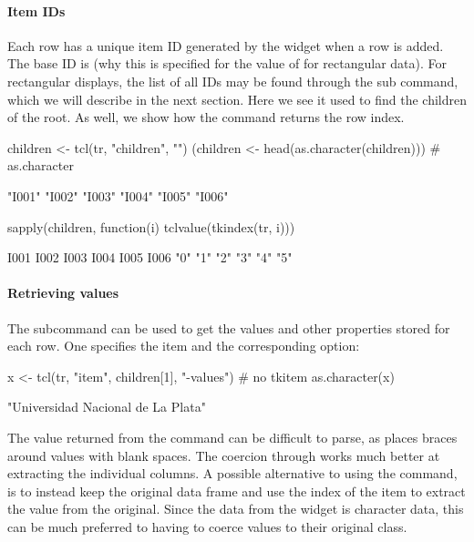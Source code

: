 \paragraph{Item IDs}
Each row has a unique item ID generated by the widget when a row is
added. The base ID is \qcode{} (why this is specified for the value of
 for rectangular data). For rectangular displays, the
list of all IDs may be found through the 
sub command, which we will describe in the next section.  Here we see
it used to find the children of the root. As well, we show how the
 command returns the row index.
\begin{Schunk}
\begin{Sinput}
 children <- tcl(tr, "children", "")
 (children <- head(as.character(children)))     # as.character
\end{Sinput}
\begin{Soutput}
[1] "I001" "I002" "I003" "I004" "I005" "I006"
\end{Soutput}
\begin{Sinput}
 sapply(children, function(i) tclvalue(tkindex(tr, i)))
\end{Sinput}
\begin{Soutput}
I001 I002 I003 I004 I005 I006 
 "0"  "1"  "2"  "3"  "4"  "5" 
\end{Soutput}
\end{Schunk}

\paragraph{Retrieving values}
The  subcommand can be used to get the
values and other properties stored for each row. One specifies the item and the
corresponding option:
\begin{Schunk}
\begin{Sinput}
 x <- tcl(tr, "item", children[1], "-values") # no tkitem
 as.character(x)
\end{Sinput}
\begin{Soutput}
[1] "Universidad Nacional de La Plata"
\end{Soutput}
\end{Schunk}
%
The value returned from the  command can be difficult to
parse, as \TCL\/ places braces around values with blank spaces. The coercion through
 works much better at extracting the individual
columns. A possible alternative to using the  command, is
to instead keep the original data frame and use the index of the item
to extract the value from the original. Since the data from the widget
is character data, this can be much preferred to having to coerce
values to their original class.

